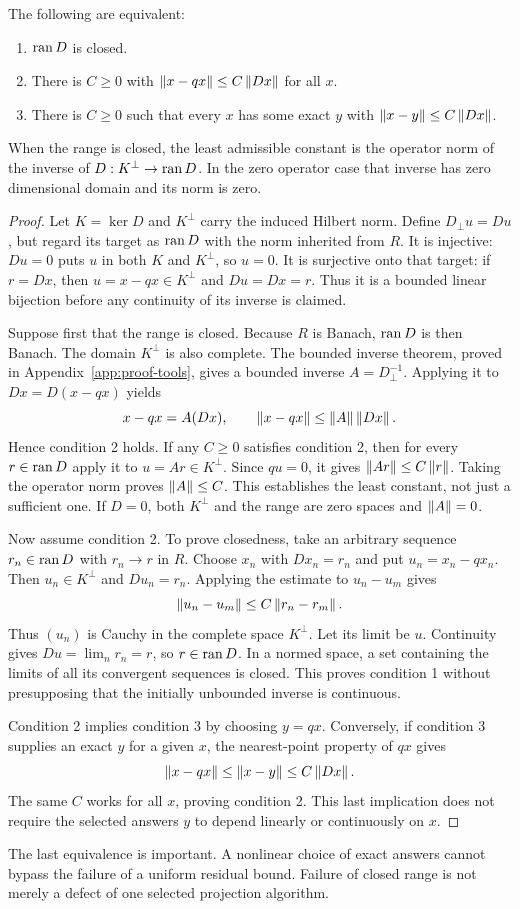 \begin{theorem}\label{KS43}
The following are equivalent:
\begin{enumerate}
\item \(\operatorname{ran} D\) is closed.
\item There is \(C\ge0\) with \(\left\lVert x-qx\right\rVert\le C\left\lVert Dx\right\rVert\) for all \(x\).
\item There is \(C\ge0\) such that every \(x\) has some exact \(y\) with \(\left\lVert x-y\right\rVert\le C\left\lVert Dx\right\rVert\).
\end{enumerate}
When the range is closed, the least admissible constant is the operator norm of the inverse of \(D:K^\perp\to\operatorname{ran} D\). In the zero operator case that inverse has zero dimensional domain and its norm is zero.
\end{theorem}
\begin{proof}
Let $K=\ker D$ and $K^\perp$ carry the induced Hilbert norm. Define $D_\perp u=Du$, but regard its target as $\operatorname{ran} D$ with the norm inherited from $R$. It is injective: $Du=0$ puts $u$ in both $K$ and $K^\perp$, so $u=0$. It is surjective onto that target: if $r=Dx$, then $u=x-qx\in K^\perp$ and $Du=Dx=r$. Thus it is a bounded linear bijection before any continuity of its inverse is claimed.

Suppose first that the range is closed. Because $R$ is Banach, $\operatorname{ran} D$ is then Banach. The domain $K^\perp$ is also complete. The bounded inverse theorem, proved in Appendix~\ref{app:proof-tools}, gives a bounded inverse $A=D_\perp^{-1}$. Applying it to $Dx=D(x-qx)$ yields
\[
 x-qx=A(Dx),\qquad \left\lVert x-qx\right\rVert\le\left\lVert A\right\rVert\left\lVert Dx\right\rVert.
\]
Hence condition 2 holds. If any $C\ge0$ satisfies condition 2, then for every $r\in\operatorname{ran} D$ apply it to $u=Ar\in K^\perp$. Since $qu=0$, it gives $\left\lVert Ar\right\rVert\le C\left\lVert r\right\rVert$. Taking the operator norm proves $\left\lVert A\right\rVert\le C$. This establishes the least constant, not just a sufficient one. If $D=0$, both $K^\perp$ and the range are zero spaces and $\left\lVert A\right\rVert=0$.

Now assume condition 2. To prove closedness, take an arbitrary sequence $r_n\in\operatorname{ran} D$ with $r_n\to r$ in $R$. Choose $x_n$ with $Dx_n=r_n$ and put $u_n=x_n-qx_n$. Then $u_n\in K^\perp$ and $Du_n=r_n$. Applying the estimate to $u_n-u_m$ gives
\[
 \left\lVert u_n-u_m\right\rVert\le C\left\lVert r_n-r_m\right\rVert.
\]
Thus $(u_n)$ is Cauchy in the complete space $K^\perp$. Let its limit be $u$. Continuity gives $Du=\lim_n r_n=r$, so $r\in\operatorname{ran} D$. In a normed space, a set containing the limits of all its convergent sequences is closed. This proves condition 1 without presupposing that the initially unbounded inverse is continuous.

Condition 2 implies condition 3 by choosing $y=qx$. Conversely, if condition 3 supplies an exact $y$ for a given $x$, the nearest-point property of $qx$ gives
\[
 \left\lVert x-qx\right\rVert\le\left\lVert x-y\right\rVert\le C\left\lVert Dx\right\rVert.
\]
The same $C$ works for all $x$, proving condition 2. This last implication does not require the selected answers $y$ to depend linearly or continuously on $x$.
\end{proof}
The last equivalence is important. A nonlinear choice of exact answers cannot bypass the failure of a uniform residual bound. Failure of closed range is not merely a defect of one selected projection algorithm.


